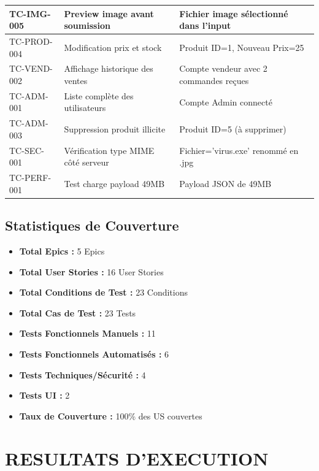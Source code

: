 \documentclass[12pt,a4paper]{article}
\begin{document}
\begin{longtable}{|p{2.5cm}|p{4.5cm}|p{6cm}|}
    TC-IMG-005 & Preview image avant soumission & Fichier image sélectionné dans l'input \\ \hline
    TC-PROD-004 & Modification prix et stock & Produit ID=1, Nouveau Prix=25 \\ \hline
    TC-VEND-002 & Affichage historique des ventes & Compte vendeur avec 2 commandes reçues \\ \hline
    TC-ADM-001 & Liste complète des utilisateurs & Compte Admin connecté \\ \hline
    TC-ADM-003 & Suppression produit illicite & Produit ID=5 (à supprimer) \\ \hline
    TC-SEC-001 & Vérification type MIME côté serveur & Fichier='virus.exe' renommé en .jpg \\ \hline
    TC-PERF-001 & Test charge payload 49MB & Payload JSON de 49MB \\ \hline
\end{longtable}

\subsection{Statistiques de Couverture}
\begin{itemize}
    \item \textbf{Total Epics :} 5 Epics
    \item \textbf{Total User Stories :} 16 User Stories
    \item \textbf{Total Conditions de Test :} 23 Conditions
    \item \textbf{Total Cas de Test :} 23 Tests
    \item \textbf{Tests Fonctionnels Manuels :} 11
    \item \textbf{Tests Fonctionnels Automatisés :} 6
    \item \textbf{Tests Techniques/Sécurité :} 4
    \item \textbf{Tests UI :} 2
    \item \textbf{Taux de Couverture :} 100\% des US couvertes
\end{itemize}

\newpage

\section{RESULTATS D'EXECUTION}
\end{document}
